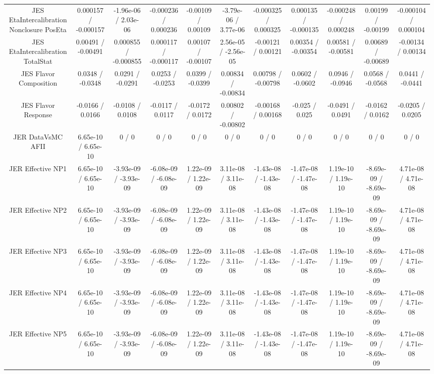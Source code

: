 \begin{table}[htbp]
\begin{center}
\begin{tabular}{|c|c|c|c|c|c|c|c|c|c|c|}
  JES EtaIntercalibration Nonclosure PosEta & 0.000157 / -0.000157 & -1.96e-06 / 2.03e-06 & -0.000236 / 0.000236 & -0.00109 / 0.00109 & -3.79e-06 / 3.77e-06 & -0.000325 / 0.000325 & 0.000135 / -0.000135 & -0.000248 / 0.000248 & 0.00199 / -0.00199 & -0.000104 / 0.000104 \\ 
  JES EtaIntercalibration TotalStat & 0.00491 / -0.00491 & 0.000855 / -0.000855 & 0.000117 / -0.000117 & 0.00107 / -0.00107 & 2.56e-05 / -2.56e-05 & -0.00121 / 0.00121 & 0.00354 / -0.00354 & 0.00581 / -0.00581 & 0.00689 / -0.00689 & -0.00134 / 0.00134 \\ 
  JES Flavor Composition & 0.0348 / -0.0348 & 0.0291 / -0.0291 & 0.0253 / -0.0253 & 0.0399 / -0.0399 & 0.00834 / -0.00834 & 0.00798 / -0.00798 & 0.0602 / -0.0602 & 0.0946 / -0.0946 & 0.0568 / -0.0568 & 0.0441 / -0.0441 \\ 
  JES Flavor Response & -0.0166 / 0.0166 & -0.0108 / 0.0108 & -0.0117 / 0.0117 & -0.0172 / 0.0172 & 0.00802 / -0.00802 & -0.00168 / 0.00168 & -0.025 / 0.025 & -0.0491 / 0.0491 & -0.0162 / 0.0162 & -0.0205 / 0.0205 \\ 
  JER DataVsMC AFII & 6.65e-10 / 6.65e-10 & 0 / 0 & 0 / 0 & 0 / 0 & 0 / 0 & 0 / 0 & 0 / 0 & 0 / 0 & 0 / 0 & 0 / 0 \\ 
  JER Effective NP1 & 6.65e-10 / 6.65e-10 & -3.93e-09 / -3.93e-09 & -6.08e-09 / -6.08e-09 & 1.22e-09 / 1.22e-09 & 3.11e-08 / 3.11e-08 & -1.43e-08 / -1.43e-08 & -1.47e-08 / -1.47e-08 & 1.19e-10 / 1.19e-10 & -8.69e-09 / -8.69e-09 & 4.71e-08 / 4.71e-08 \\ 
  JER Effective NP2 & 6.65e-10 / 6.65e-10 & -3.93e-09 / -3.93e-09 & -6.08e-09 / -6.08e-09 & 1.22e-09 / 1.22e-09 & 3.11e-08 / 3.11e-08 & -1.43e-08 / -1.43e-08 & -1.47e-08 / -1.47e-08 & 1.19e-10 / 1.19e-10 & -8.69e-09 / -8.69e-09 & 4.71e-08 / 4.71e-08 \\ 
  JER Effective NP3 & 6.65e-10 / 6.65e-10 & -3.93e-09 / -3.93e-09 & -6.08e-09 / -6.08e-09 & 1.22e-09 / 1.22e-09 & 3.11e-08 / 3.11e-08 & -1.43e-08 / -1.43e-08 & -1.47e-08 / -1.47e-08 & 1.19e-10 / 1.19e-10 & -8.69e-09 / -8.69e-09 & 4.71e-08 / 4.71e-08 \\ 
  JER Effective NP4 & 6.65e-10 / 6.65e-10 & -3.93e-09 / -3.93e-09 & -6.08e-09 / -6.08e-09 & 1.22e-09 / 1.22e-09 & 3.11e-08 / 3.11e-08 & -1.43e-08 / -1.43e-08 & -1.47e-08 / -1.47e-08 & 1.19e-10 / 1.19e-10 & -8.69e-09 / -8.69e-09 & 4.71e-08 / 4.71e-08 \\ 
  JER Effective NP5 & 6.65e-10 / 6.65e-10 & -3.93e-09 / -3.93e-09 & -6.08e-09 / -6.08e-09 & 1.22e-09 / 1.22e-09 & 3.11e-08 / 3.11e-08 & -1.43e-08 / -1.43e-08 & -1.47e-08 / -1.47e-08 & 1.19e-10 / 1.19e-10 & -8.69e-09 / -8.69e-09 & 4.71e-08 / 4.71e-08 \\ 

\end{tabular}
\end{center}
\end{table}
